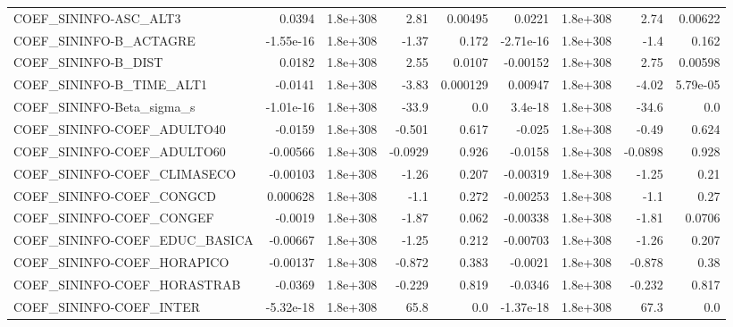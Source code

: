 \begin{tabular}{lrrrrrrrr}
COEF\_SININFO-ASC\_ALT3             &      0.0394 &     1.8e+308 &      2.81 &  0.00495 &     0.0221 &    1.8e+308 &         2.74 &       0.00622 \\
COEF\_SININFO-B\_ACTAGRE            &   -1.55e-16 &     1.8e+308 &     -1.37 &    0.172 &  -2.71e-16 &    1.8e+308 &         -1.4 &         0.162 \\
COEF\_SININFO-B\_DIST               &      0.0182 &     1.8e+308 &      2.55 &   0.0107 &   -0.00152 &    1.8e+308 &         2.75 &       0.00598 \\
COEF\_SININFO-B\_TIME\_ALT1          &     -0.0141 &     1.8e+308 &     -3.83 & 0.000129 &    0.00947 &    1.8e+308 &        -4.02 &      5.79e-05 \\
COEF\_SININFO-Beta\_sigma\_s         &   -1.01e-16 &     1.8e+308 &     -33.9 &      0.0 &    3.4e-18 &    1.8e+308 &        -34.6 &           0.0 \\
COEF\_SININFO-COEF\_ADULTO40        &     -0.0159 &     1.8e+308 &    -0.501 &    0.617 &     -0.025 &    1.8e+308 &        -0.49 &         0.624 \\
COEF\_SININFO-COEF\_ADULTO60        &    -0.00566 &     1.8e+308 &   -0.0929 &    0.926 &    -0.0158 &    1.8e+308 &      -0.0898 &         0.928 \\
COEF\_SININFO-COEF\_CLIMASECO       &    -0.00103 &     1.8e+308 &     -1.26 &    0.207 &   -0.00319 &    1.8e+308 &        -1.25 &          0.21 \\
COEF\_SININFO-COEF\_CONGCD          &    0.000628 &     1.8e+308 &      -1.1 &    0.272 &   -0.00253 &    1.8e+308 &         -1.1 &          0.27 \\
COEF\_SININFO-COEF\_CONGEF          &     -0.0019 &     1.8e+308 &     -1.87 &    0.062 &   -0.00338 &    1.8e+308 &        -1.81 &        0.0706 \\
COEF\_SININFO-COEF\_EDUC\_BASICA     &    -0.00667 &     1.8e+308 &     -1.25 &    0.212 &   -0.00703 &    1.8e+308 &        -1.26 &         0.207 \\
COEF\_SININFO-COEF\_HORAPICO        &    -0.00137 &     1.8e+308 &    -0.872 &    0.383 &    -0.0021 &    1.8e+308 &       -0.878 &          0.38 \\
COEF\_SININFO-COEF\_HORASTRAB       &     -0.0369 &     1.8e+308 &    -0.229 &    0.819 &    -0.0346 &    1.8e+308 &       -0.232 &         0.817 \\
COEF\_SININFO-COEF\_INTER           &   -5.32e-18 &     1.8e+308 &      65.8 &      0.0 &  -1.37e-18 &    1.8e+308 &         67.3 &           0.0 \\

\end{tabular}
